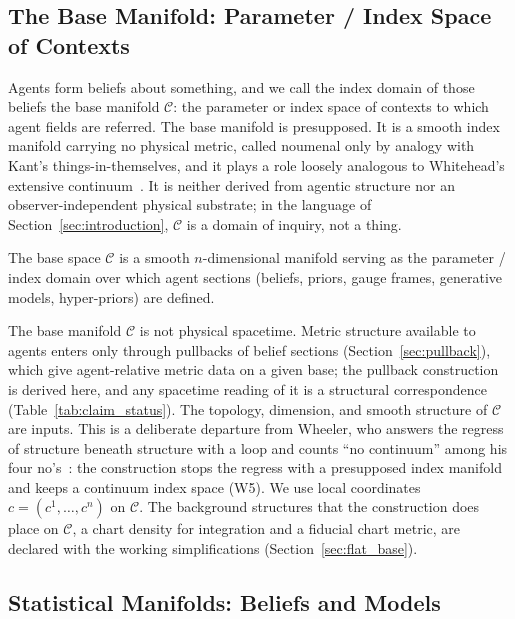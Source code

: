 \subsection{The Base Manifold: Parameter / Index Space of Contexts}

Agents form beliefs about something, and we call the index domain of those beliefs the base manifold $\mathcal{C}$: the parameter or index space of contexts to which agent fields are referred. The base manifold is presupposed. It is a smooth index manifold carrying no physical metric, called noumenal only by analogy with Kant's things-in-themselves, and it plays a role loosely analogous to Whitehead's extensive continuum~\cite{Whitehead1929}. It is neither derived from agentic structure nor an observer-independent physical substrate; in the language of Section~\ref{sec:introduction}, $\mathcal{C}$ is a domain of inquiry, not a thing.

\begin{definition}
\label{def:base_manifold}
The base space $\mathcal{C}$ is a smooth $n$-dimensional manifold serving as the parameter / index domain over which agent sections (beliefs, priors, gauge frames, generative models, hyper-priors) are defined.
\end{definition}

The base manifold $\mathcal{C}$ is not physical spacetime. Metric structure available to agents enters only through pullbacks of belief sections (Section~\ref{sec:pullback}), which give agent-relative metric data on a given base; the pullback construction is derived here, and any spacetime reading of it is a structural correspondence (Table~\ref{tab:claim_status}). The topology, dimension, and smooth structure of $\mathcal{C}$ are inputs. This is a deliberate departure from Wheeler, who answers the regress of structure beneath structure with a loop and counts ``no continuum'' among his four no's~\cite{Wheeler1990}: the construction stops the regress with a presupposed index manifold and keeps a continuum index space (W5). We use local coordinates $c = (c^1, \ldots, c^n)$ on $\mathcal{C}$. The background structures that the construction does place on $\mathcal{C}$, a chart density for integration and a fiducial chart metric, are declared with the working simplifications (Section~\ref{sec:flat_base}).

\subsection{Statistical Manifolds: Beliefs and Models}
\label{sec:statistical_manifolds}

